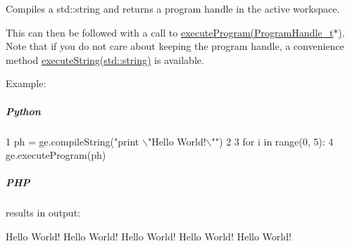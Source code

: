 Compiles a std\-::string and returns a program handle in the active workspace. 

This can then be followed with a call to \hyperlink{class_g_a_u_s_s_a7fc9de69421c14aadb9a6310fecabcca}{execute\-Program(\-Program\-Handle\-\_\-t$\ast$)}. Note that if you do not care about keeping the program handle, a convenience method \hyperlink{class_g_a_u_s_s_a3680b0addd695d8a5690a1e2d3fc0d8b}{execute\-String(std\-::string)} is available.

Example\-:

\subparagraph*{Python}


\begin{DoxyCode}
1 ph = ge.compileString(\textcolor{stringliteral}{"print \(\backslash\)"Hello World!\(\backslash\)""})
2 
3 \textcolor{keywordflow}{for} i \textcolor{keywordflow}{in} range(0, 5):
4     ge.executeProgram(ph)
\end{DoxyCode}


\subparagraph*{P\-H\-P}


 results in output\-: 
\begin{DoxyCode}
Hello World!
Hello World!
Hello World!
Hello World!
Hello World!
\end{DoxyCode}



